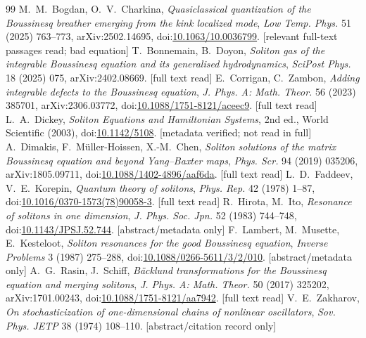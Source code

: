 \documentclass[11pt,a4paper]{article}
\theoremstyle{remark}
\begin{document}
\begin{thebibliography}{99}\footnotesize\setlength{\itemsep}{1pt}
 M.~M.~Bogdan, O.~V.~Charkina, \emph{Quasiclassical quantization of the Boussinesq breather emerging from the kink localized mode}, \emph{Low Temp. Phys.} 51 (2025) 763--773, arXiv:2502.14695, doi:\url{10.1063/10.0036799}. [relevant full-text passages read; bad equation]
 T.~Bonnemain, B.~Doyon, \emph{Soliton gas of the integrable Boussinesq equation and its generalised hydrodynamics}, \emph{SciPost Phys.} 18 (2025) 075, arXiv:2402.08669. [full text read]
 E.~Corrigan, C.~Zambon, \emph{Adding integrable defects to the Boussinesq equation}, \emph{J. Phys. A: Math. Theor.} 56 (2023) 385701, arXiv:2306.03772, doi:\url{10.1088/1751-8121/aceec9}. [full text read]
 L.~A.~Dickey, \emph{Soliton Equations and Hamiltonian Systems}, 2nd ed., World Scientific (2003), doi:\url{10.1142/5108}. [metadata verified; not read in full]
 A.~Dimakis, F.~M\"uller-Hoissen, X.-M.~Chen, \emph{ Soliton solutions of the matrix Boussinesq equation and beyond Yang--Baxter maps}, \emph{Phys. Scr.} 94 (2019) 035206, arXiv:1805.09711, doi:\url{10.1088/1402-4896/aaf6da}. [full text read]
 L.~D.~Faddeev, V.~E.~Korepin, \emph{Quantum theory of solitons}, \emph{Phys. Rep.} 42 (1978) 1--87, doi:\url{10.1016/0370-1573(78)90058-3}. [full text read]
 R.~Hirota, M.~Ito, \emph{Resonance of solitons in one dimension}, \emph{J. Phys. Soc. Jpn.} 52 (1983) 744--748, doi:\url{10.1143/JPSJ.52.744}. [abstract/metadata only]
 F.~Lambert, M.~Musette, E.~Kesteloot, \emph{Soliton resonances for the good Boussinesq equation}, \emph{Inverse Problems} 3 (1987) 275--288, doi:\url{10.1088/0266-5611/3/2/010}. [abstract/metadata only]
 A.~G.~Rasin, J.~Schiff, \emph{B\"acklund transformations for the Boussinesq equation and merging solitons}, \emph{J. Phys. A: Math. Theor.} 50 (2017) 325202, arXiv:1701.00243, doi:\url{10.1088/1751-8121/aa7942}. [full text read]
 V.~E.~Zakharov, \emph{On sto\-chastic\-i\-za\-tion of one-dimensional chains of nonlinear oscillators}, \emph{Sov. Phys. JETP} 38 (1974) 108--110. [abstract/citation record only]
\end{thebibliography}
\end{document}
